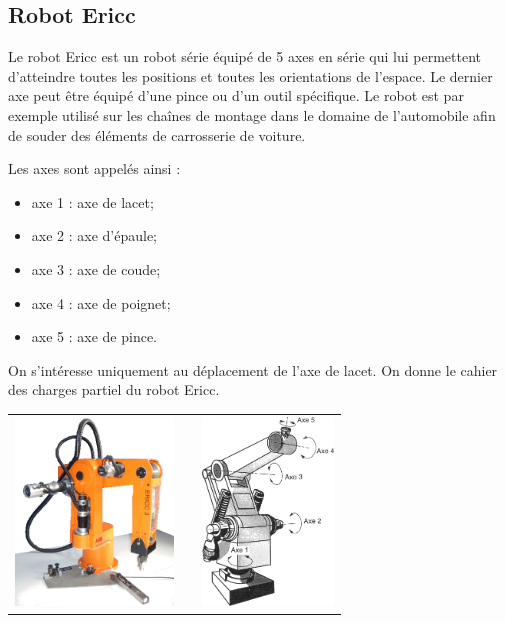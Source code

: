 \documentclass[11pt,oneside]{article}
\begin{document}
\vspace{.5cm}

\setcounter{subparagraph}{0}

\subsection*{Robot Ericc}

Le robot Ericc est un robot série équipé de 5 axes en série qui lui permettent d'atteindre toutes les positions et toutes les orientations de l'espace. Le dernier axe peut être équipé d'une pince ou d'un outil spécifique. Le robot est par exemple utilisé sur les chaînes de montage dans le domaine de l'automobile afin de souder des éléments de carrosserie de voiture.

\noindent\begin{minipage}[c]{.5\linewidth}
Les axes sont appelés ainsi :
\begin {itemize}
\item axe 1 : axe de lacet;
\item axe 2 : axe d'épaule;
\item axe 3 : axe de coude;
\item axe 4 : axe de poignet;
\item axe 5 : axe de pince. 
\end{itemize}
On s'intéresse uniquement au déplacement de l'axe de lacet. On donne le cahier des charges partiel du robot Ericc. 
\end{minipage} \hfill
\begin{minipage}[c]{.45\linewidth}
\begin{center}
\begin{tabular}{ccc}
\includegraphics[height=5cm]{png/ericc_1}&&
\includegraphics[height=5cm]{png/ericc_2}
\end{tabular}
\end{center}
\end{minipage}
\end{document}
